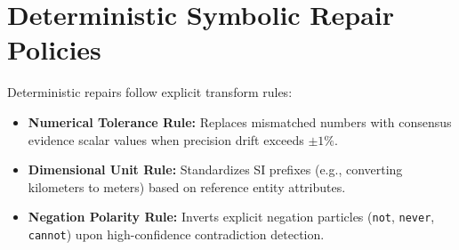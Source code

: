 \documentclass[11pt,a4paper]{article}
\begin{document}
\section{Deterministic Symbolic Repair Policies}
Deterministic repairs follow explicit transform rules:
\begin{itemize}
    \item \textbf{Numerical Tolerance Rule:} Replaces mismatched numbers with consensus evidence scalar values when precision drift exceeds $\pm 1\%$.
    \item \textbf{Dimensional Unit Rule:} Standardizes SI prefixes (e.g., converting kilometers to meters) based on reference entity attributes.
    \item \textbf{Negation Polarity Rule:} Inverts explicit negation particles (\texttt{not}, \texttt{never}, \texttt{cannot}) upon high-confidence contradiction detection.
\end{itemize}
\end{document}

